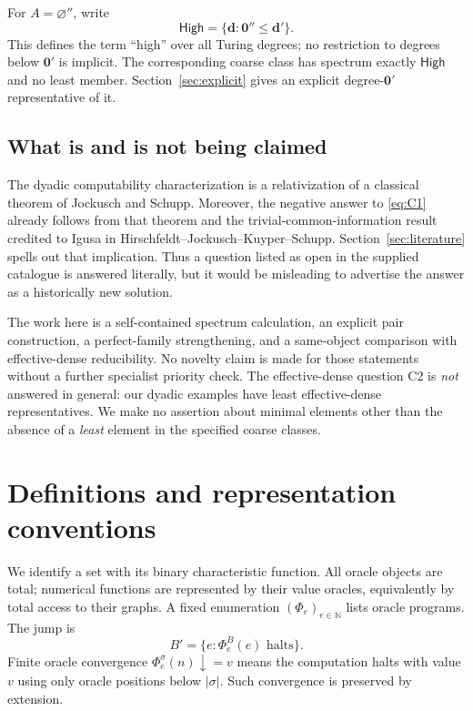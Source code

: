 \documentclass[11pt,a4paper]{article}
\newcommand{\N}{\mathbb N}
\newcommand{\zero}{\mathbf 0}
\newcommand{\ddeg}{\mathbf d}
\newcommand{\High}{\mathsf{High}}
\theoremstyle{definition}\newtheorem{definition}[theorem]{Definition}
\theoremstyle{remark}\newtheorem{remark}[theorem]{Remark}
\begin{document}
For $A=\varnothing''$, write
\begin{equation}\label{eq:high}
 \High=\{\ddeg:\zero''\leq\ddeg'\}.
\end{equation}
This defines the term ``high'' over all Turing degrees; no restriction to degrees below $\zero'$ is implicit. The corresponding coarse class has spectrum exactly $\High$ and no least member. Section~\ref{sec:explicit} gives an explicit degree-$\zero'$ representative of it.

\subsection{What is and is not being claimed}
The dyadic computability characterization is a relativization of a classical theorem of Jockusch and Schupp.\cite[Theorem~2.19]{JS} Moreover, the negative answer to \eqref{eq:C1} already follows from that theorem and the trivial-common-information result credited to Igusa in Hirschfeldt--Jockusch--Kuyper--Schupp.\cite[Theorem~4.3]{HJKS} Section~\ref{sec:literature} spells out that implication. Thus a question listed as open in the supplied catalogue is answered literally, but it would be misleading to advertise the answer as a historically new solution.

The work here is a self-contained spectrum calculation, an explicit pair construction, a perfect-family strengthening, and a same-object comparison with effective-dense reducibility. No novelty claim is made for those statements without a further specialist priority check. The effective-dense question C2 is \emph{not} answered in general: our dyadic examples have least effective-dense representatives. We make no assertion about minimal elements other than the absence of a \emph{least} element in the specified coarse classes.

\section{Definitions and representation conventions}
\label{sec:defs}
We identify a set with its binary characteristic function. All oracle objects are total; numerical functions are represented by their value oracles, equivalently by total access to their graphs. A fixed enumeration $(\Phi_e)_{e\in\N}$ lists oracle programs. The jump is
\[
 B'=\{e:\Phi_e^B(e)\text{ halts}\}.
\]
Finite oracle convergence $\Phi_e^\sigma(n)\downarrow=v$ means the computation halts with value $v$ using only oracle positions below $|\sigma|$. Such convergence is preserved by extension.
\end{document}
